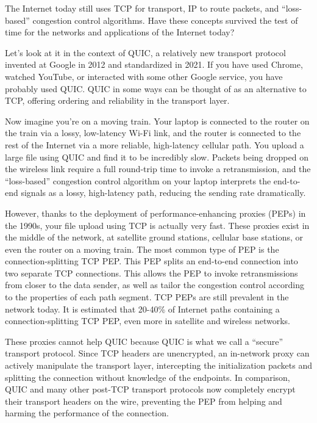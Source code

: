 
The Internet today still uses TCP for transport, IP to route packets, and
``loss-based'' congestion control algorithms. Have these concepts survived the
test of time for the networks and applications of the Internet today?

Let's look at it in the context of QUIC, a relatively new transport protocol
invented at Google in 2012 and standardized in 2021. If you have used Chrome,
watched YouTube, or interacted with some other Google service, you have
probably used QUIC. QUIC in some ways can be thought of as an alternative to
TCP, offering ordering and reliability in the transport layer.

Now imagine you're on a moving train. Your laptop is connected to the router on
the train via a lossy, low-latency Wi-Fi link, and the router is connected to
the rest of the Internet via a more reliable, high-latency cellular path. You
upload a large file using QUIC and find it to be incredibly slow. Packets being
dropped on the wireless link require a full round-trip time to invoke a
retransmission, and the ``loss-based'' congestion control algorithm on your
laptop interprets the end-to-end signals as a lossy, high-latency path,
reducing the sending rate dramatically.

However, thanks to the deployment of performance-enhancing proxies (PEPs) in the
1990s, your file upload using TCP is actually very fast. These proxies exist in
the middle of the network, at satellite ground stations, cellular base
stations, or even the router on a moving train. The most common type of PEP is
the connection-splitting TCP PEP. This PEP splits an end-to-end connection into
two separate TCP connections. This allows the PEP to invoke retransmissions
from closer to the data sender, as well as tailor the congestion control
according to the properties of each path segment. TCP PEPs are still prevalent
in the network today. It is estimated that 20-40\% of Internet paths containing
a connection-splitting TCP PEP, even more in satellite and wireless networks.

These proxies cannot help QUIC because QUIC is what we call a ``secure''
transport protocol. Since TCP headers are unencrypted, an in-network proxy can
actively manipulate the transport layer, intercepting the initialization
packets and splitting the connection without knowledge of the endpoints. In
comparison, QUIC and many other post-TCP transport protocols now completely
encrypt their transport headers on the wire, preventing the PEP from helping
and harming the performance of the connection.

